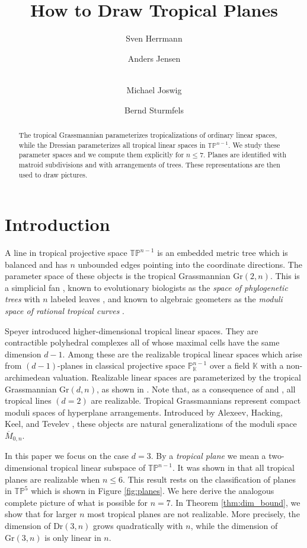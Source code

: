 \documentclass[12pt,a4paper]{amsart}
\title{How to Draw Tropical Planes}
\author[Herrmann, Jensen, Joswig, and Sturmfels]{Sven Herrmann \and 
Anders Jensen \and \\ Michael Joswig \and Bernd Sturmfels}
\theoremstyle{definition}
\newcommand{\K}{{\mathbb{K}}}
\newcommand{\PP}{{\mathbb{P}}}
\newcommand{\Gr}{{\mathrm{Gr}}}
\newcommand{\Dr}{{\mathrm{Dr}}}
\newcommand{\TP}{{\mathbb{TP}}}
\begin{document}


\maketitle

\begin{abstract}
  The tropical Grassmannian parameterizes tropicalizations of ordinary
  linear spaces, while the Dressian parameterizes all tropical linear
  spaces in $\TP^{n-1}$.  We study these parameter spaces and we
  compute them explicitly for $n \leq 7$.  Planes are identified with
  matroid subdivisions and with arrangements of trees.  These
  representations are then used to draw pictures.
\end{abstract}


\section{Introduction}

A line in tropical projective space $\TP^{n-1}$ is an embedded metric tree
which is balanced and has $n$ unbounded edges pointing into the coordinate
directions. The parameter space of these objects is the tropical Grassmannian
$\Gr(2,n)$. This is a simplicial fan \cite{SS}, known to evolutionary
biologists as the \emph{space of phylogenetic trees} with $n$ labeled leaves
\cite[\S 3.5]{ASCB}, and known to algebraic geometers as the \emph{moduli
  space of rational tropical curves} \cite{Mik}.

Speyer \cite{Spe1, Spe2} introduced higher-dimensional tropical linear
spaces. They are contractible polyhedral complexes all of whose maximal cells
have the same dimension $d-1$.  Among these are the realizable tropical linear
spaces which arise from $(d-1)$-planes in classical projective space
$\PP^{n-1}_\K$ over a field $\K$ with a non-archimedean valuation.  Realizable
linear spaces are parameterized by the tropical Grassmannian $\Gr(d,n)$, as
shown in \cite{SS}.  Note that, as a consequence of \cite[Theorem 3.4]{SS} and
\cite[Proposition 2.2]{Spe1}, all tropical lines $(d=2)$ are realizable.
Tropical Grassmannians represent compact moduli spaces of hyperplane
arrangements.  Introduced by Alexeev, Hacking, Keel, and Tevelev \cite{Ale,
  HKT, KT}, these objects are natural generalizations of the moduli space
$\overline{M}_{0,n}$.

In this paper we focus on the case $d=3$.  By a \emph{tropical plane} we mean
a two-dimensional tropical linear subspace of $\TP^{n-1}$. It was shown in
\cite[\S 5]{SS} that all tropical planes are realizable when $n \leq 6$. This
result rests on the classification of planes in $\TP^5$ which is shown in
Figure \ref{fig:planes}.  We here derive the analogous complete picture of
what is possible for $n=7$.  In Theorem \ref{thm:dim_bound}, we show that for
larger $n$ most tropical planes are not realizable.  More precisely, the
dimension of $\Dr(3,n)$ grows quadratically with $n$, while the dimension of
$\Gr(3,n)$ is only linear in $n$.
\end{document}
